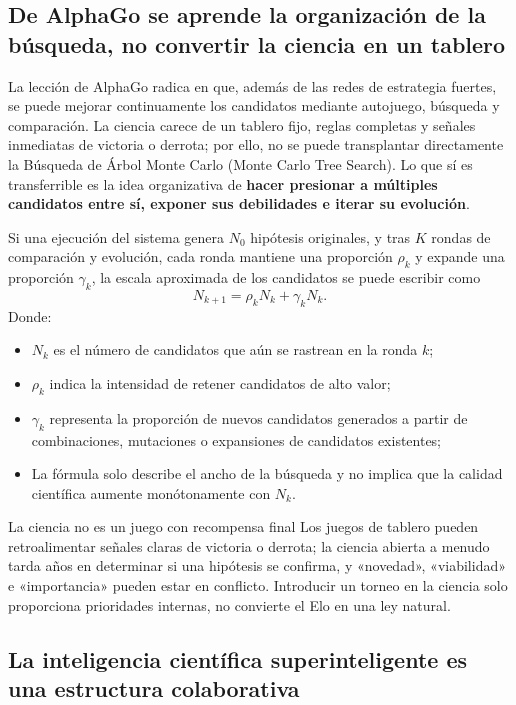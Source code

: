 \subsection{De AlphaGo se aprende la organización de la búsqueda, no convertir la ciencia en un tablero}

La lección de AlphaGo radica en que, además de las redes de estrategia fuertes, se puede mejorar continuamente los candidatos mediante autojuego, búsqueda y comparación. La ciencia carece de un tablero fijo, reglas completas y señales inmediatas de victoria o derrota; por ello, no se puede transplantar directamente la Búsqueda de Árbol Monte Carlo (Monte Carlo Tree Search). Lo que sí es transferrible es la idea organizativa de \textbf{hacer presionar a múltiples candidatos entre sí, exponer sus debilidades e iterar su evolución}.

Si una ejecución del sistema genera $N_0$ hipótesis originales, y tras $K$ rondas de comparación y evolución, cada ronda mantiene una proporción $\rho_k$ y expande una proporción $\gamma_k$, la escala aproximada de los candidatos se puede escribir como
$$
N_{k+1}=\rho_kN_k+\gamma_kN_k.
$$
Donde:
\begin{itemize}
  \item $N_k$ es el número de candidatos que aún se rastrean en la ronda $k$;
  \item $\rho_k$ indica la intensidad de retener candidatos de alto valor;
  \item $\gamma_k$ representa la proporción de nuevos candidatos generados a partir de combinaciones, mutaciones o expansiones de candidatos existentes;
  \item La fórmula solo describe el ancho de la búsqueda y no implica que la calidad científica aumente monótonamente con $N_k$.
\end{itemize}

\begin{warningbox}{La ciencia no es un juego con recompensa final}
Los juegos de tablero pueden retroalimentar señales claras de victoria o derrota; la ciencia abierta a menudo tarda años en determinar si una hipótesis se confirma, y «novedad», «viabilidad» e «importancia» pueden estar en conflicto. Introducir un torneo en la ciencia solo proporciona prioridades internas, no convierte el Elo en una ley natural.
\end{warningbox}

\subsection{La inteligencia científica superinteligente es una estructura colaborativa}

